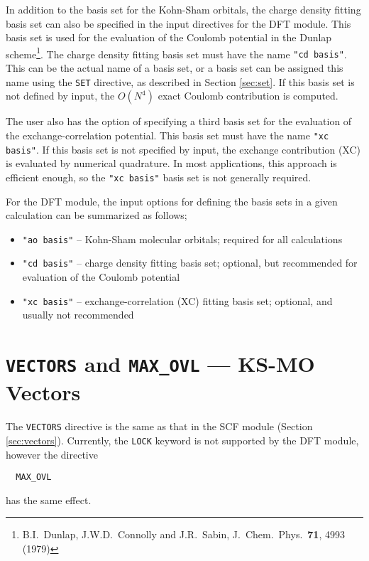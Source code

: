 In addition to the basis set for the Kohn-Sham orbitals, 
the charge density fitting basis set can also be specified in the 
input directives for the DFT module.  This basis set is used for the 
evaluation of the Coulomb potential in the Dunlap scheme\footnote{B.I.~Dunlap, 
J.W.D.~Connolly and J.R.~Sabin, J.~Chem.~Phys.~{\bf 71},  4993 (1979)}.
The charge density fitting basis set must have the name {\tt "cd basis"}.
This can be the actual name of a basis set, or a basis set can be 
assigned this name using the \verb+SET+ directive, as described in
Section \ref{sec:set}.  If this basis set is not defined by input,
the $O(N^4)$ exact Coulomb contribution is computed.

The user also has the option of specifying a third basis set for the 
evaluation of the exchange-correlation potential.  This basis set must
have the name {\tt "xc basis"}.  If this basis set is not specified
by input, the exchange contribution (XC) is evaluated by numerical
quadrature.  In most applications, this approach is efficient enough,
so the {\tt "xc basis"} basis set is not generally required.

For the DFT module, the input options for defining the basis sets in a given
calculation can be summarized as follows;
\begin{itemize}
\item {\tt "ao basis"} -- Kohn-Sham molecular orbitals; required for all 
calculations
\item {\tt "cd basis"} -- charge density fitting basis set; optional, but
recommended for evaluation of the Coulomb potential
\item {\tt "xc basis"} -- exchange-correlation (XC) fitting basis set; 
optional, and usually not recommended
\end{itemize}


\section{{\tt VECTORS} and {\tt MAX\_OVL} --- KS-MO Vectors}

The \verb+VECTORS+ directive is the same as that in the SCF module
(Section \ref{sec:vectors}).  Currently, the \verb+LOCK+ keyword
is not supported by the DFT module, however the directive
\begin{verbatim}
  MAX_OVL
\end{verbatim}
has the same effect.

